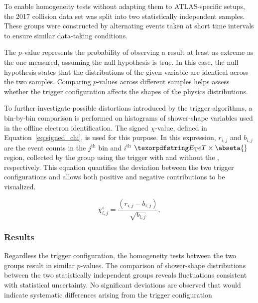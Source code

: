 
To enable homogeneity tests without adapting them to ATLAS-specific setups, the 2017 collision data set was split into two statistically independent samples. These groups were constructed by alternating events taken at short time intervals to ensure similar data-taking conditions.

The $p$-value represents the probability of observing a result at least as extreme as the one measured, assuming the null hypothesis is true. In this case, the null hypothesis states that the distributions of the given variable are identical across the two samples. Comparing $p$-values across different samples helps assess whether the trigger configuration affects the shapes of the physics distributions.

To further investigate possible distortions introduced by the trigger algorithms, a bin-by-bin comparison is performed on histograms of shower-shape variables used in the offline electron identification. The signed $\chi$-value, defined in Equation~\ref{eq:signed_chi}, is used for this purpose. In this expression, $r_{i,j}$ and $b_{i,j}$ are the event counts in the $j^\text{th}$ bin and $i^\text{th}$ $\et{}\times\abseta{}$ region, collected by the group using the trigger with and without the \rnn{}, respectively. This equation quantifies the deviation between the two trigger configurations and allows both positive and negative contributions to be visualized.

\begin{equation}
  \chi_{i,j}^{s} = \frac{(r_{i,j} - b_{i,j})}{\sqrt{b_{i,j}}},
  \label{eq:signed_chi}
\end{equation}


\subsubsection{Results}\label{top:agreement_homogeneity_results}




Regardless the trigger configuration, the homogeneity tests between the two groups result in similar $p$-values. %
The comparison of shower-shape distributions between the two statistically independent groups reveals fluctuations consistent with statistical uncertainty. No significant deviations are observed that would indicate systematic differences arising from the trigger configuration

